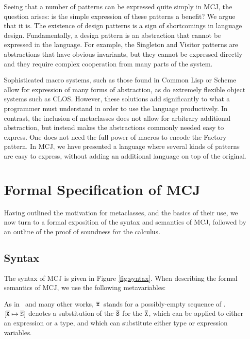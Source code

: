 \documentclass{acm-sigplan}
\begin{document}
Seeing that a number of patterns can be expressed quite simply in MCJ,
the question arises: is the simple expression of these patterns a
benefit?  We argue that it is.  The existence of design patterns is a
sign of shortcomings in language design.  Fundamentally, a design
pattern is an abstraction that cannot be expressed in the language.
For example, the Singleton and Visitor patterns are abstractions that
have obvious invariants, but they cannot be expressed directly and
they require complex cooperation from many parts of the system.

Sophisticated macro systems, such as those found in Common Lisp
\cite{steele-90} or Scheme \cite{SyntaxCase} allow for expression of
many forms of abstraction, as do extremely flexible object systems
such as CLOS. However, these solutions add significantly to what a
programmer must understand in order to use the language productively.
In contrast, the inclusion of metaclasses does not allow for arbitrary
additional abstraction, but instead makes the abstractions commonly
needed easy to express.  One does not need the full power of macros to
encode the Factory pattern.  In MCJ, we have presented a language
where several kinds of patterns are easy to express, without adding an
additional language on top of the original.


\section{Formal Specification of MCJ}

\label{formal}

Having outlined the motivation for metaclasses, and the basics of
their use, we now turn to a formal exposition of the syntax and
semantics of MCJ, followed by an outline of the proof of soundness for
the calculus.


\subsection{Syntax}
\label{Syntax}

\figSyntax

The syntax of MCJ is given in Figure \ref{fig:syntax}. When describing
the formal semantics of MCJ, we use the following metavariables:

\metavars

As in \FJ\ and many other works, ${\overline{{\mbox {\tt x}}}}$\ stands for a possibly-empty
sequence of \x.  $[{\overline {\mbox {\tt X}}} \mapsto {\overline {\mbox {\tt S}}}]$ denotes a substitution of the ${\overline{{\mbox {\tt S}}}}$ for the
${\overline{{\mbox {\tt X}}}}$, which can be applied to either an expression or a type, and
which can substitute either type or expression variables.
\end{document}
